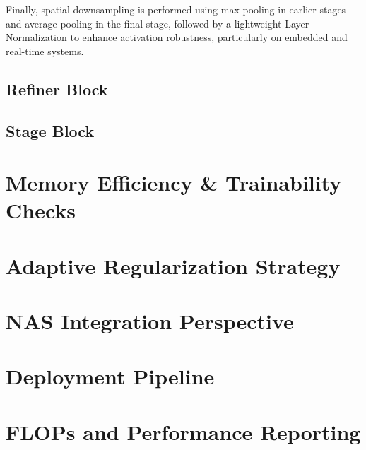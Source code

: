 Finally, spatial downsampling is performed using max pooling in earlier stages and average pooling in the final stage, followed by a lightweight Layer Normalization to enhance activation robustness, particularly on embedded and real-time systems.

\subsection{Refiner Block}


\subsection{Stage Block}


\section{Memory Efficiency \& Trainability Checks}

\section{Adaptive Regularization Strategy}

\section{NAS Integration Perspective}

\section{Deployment Pipeline}

\section{FLOPs and Performance Reporting}
